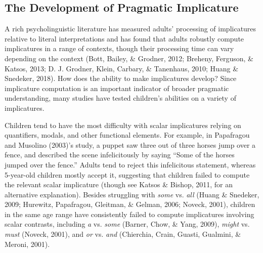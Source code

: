 \documentclass[man]{apa6}
\theoremstyle{definition}
\theoremstyle{definition}
\theoremstyle{definition}
\theoremstyle{remark}
\begin{document}
\subsection{The Development of Pragmatic
Implicature}\label{the-development-of-pragmatic-implicature}

A rich psycholinguistic literature has measured adults' processing of
implicatures relative to literal interpretations and has found that
adults robustly compute implicatures in a range of contexts, though
their processing time can vary depending on the context (Bott, Bailey,
\& Grodner, 2012; Breheny, Ferguson, \& Katsos, 2013; D. J. Grodner,
Klein, Carbary, \& Tanenhaus, 2010; Huang \& Snedeker, 2018). How does
the ability to make implicatures develop? Since implicature computation
is an important indicator of broader pragmatic understanding, many
studies have tested children's abilities on a variety of implicatures.

Children tend to have the most difficulty with scalar implicatures
relying on quantifiers, modals, and other functional elements. For
example, in Papafragou and Musolino (2003)'s study, a puppet saw three
out of three horses jump over a fence, and described the scene
infelicitously by saying \enquote{Some of the horses jumped over the
fence.} Adults tend to reject this infelicitous statement, whereas
5-year-old children mostly accept it, suggesting that children failed to
compute the relevant scalar implicature (though see Katsos \& Bishop,
2011, for an alternative explanation). Besides struggling with
\emph{some} vs. \emph{all} (Huang \& Snedeker, 2009; Hurewitz,
Papafragou, Gleitman, \& Gelman, 2006; Noveck, 2001), children in the
same age range have consistently failed to compute implicatures
involving scalar contrasts, including \emph{a} vs. \emph{some} (Barner,
Chow, \& Yang, 2009), \emph{might} vs. \emph{must} (Noveck, 2001), and
\emph{or} vs. \emph{and} (Chierchia, Crain, Guasti, Gualmini, \& Meroni,
2001).
\end{document}

